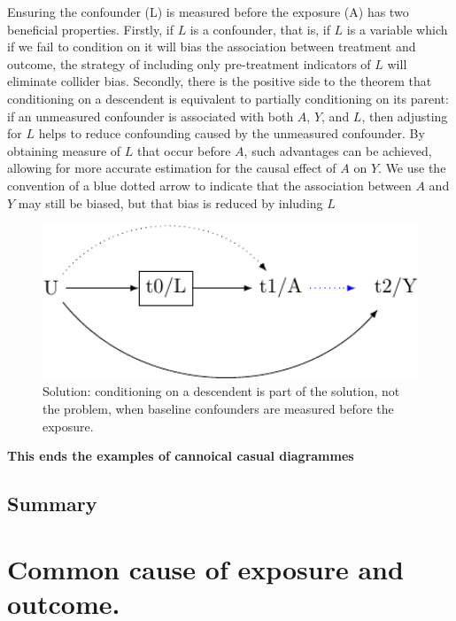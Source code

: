 \documentclass[
  singlecolumn]{report}
\begin{document}
Ensuring the confounder (L) is measured before the exposure (A) has two
beneficial properties. Firstly, if \(L\) is a confounder, that is, if
\(L\) is a variable which if we fail to condition on it will bias the
association between treatment and outcome, the strategy of including
only pre-treatment indicators of \(L\) will eliminate collider bias.
Secondly, there is the positive side to the theorem that conditioning on
a descendent is equivalent to partially conditioning on its parent: if
an unmeasured confounder is associated with both \(A\), \(Y\), and
\(L\), then adjusting for \(L\) helps to reduce confounding caused by
the unmeasured confounder. By obtaining measure of \(L\) that occur
before \(A\), such advantages can be achieved, allowing for more
accurate estimation for the causal effect of \(A\) on \(Y\). We use the
convention of a blue dotted arrow to indicate that the association
between \(A\) and \(Y\) may still be biased, but that bias is reduced by
inluding \(L\)

\begin{figure}

{\centering \includegraphics[width=1\textwidth,height=\textheight]{causal-dags_files/figure-pdf/fig-dag-descendent-solution-1.pdf}

}

\caption{\label{fig-dag-descendent-solution}Solution: conditioning on a
descendent is part of the solution, not the problem, when baseline
confounders are measured before the exposure.}

\end{figure}

\textbf{This ends the examples of cannoical casual diagrammes}

\hypertarget{summary}{%
\subsection{Summary}\label{summary}}

\hypertarget{common-cause-of-exposure-and-outcome.}{%
\section{Common cause of exposure and
outcome.}\label{common-cause-of-exposure-and-outcome.}}
\end{document}
